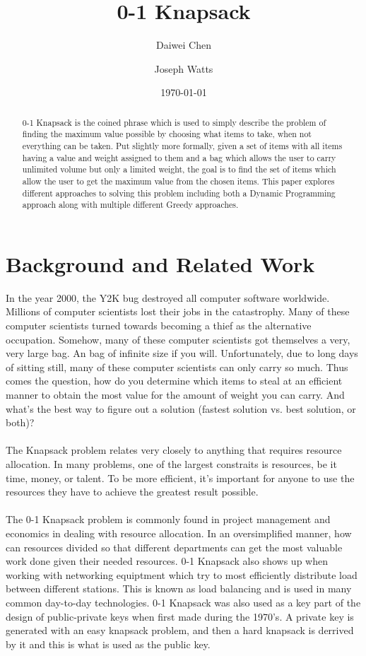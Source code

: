 \documentclass[10pt, letterpaper]{article}
\title{0-1 Knapsack}
\author{Daiwei Chen \and Joseph Watts}
\date{\today}
\begin{document}
\maketitle
\begin{abstract}
	0-1 Knapsack is the coined phrase which is used to simply describe the problem of finding the maximum value possible by choosing what items to take, when not everything can be taken.
 Put slightly more formally, given a set of items with all items having a value and weight assigned to them and a bag which allows the user to carry unlimited volume but only a limited weight, the goal is to find the set of items which allow the user to get the maximum value from the chosen items.
This paper explores different approaches to solving this problem including both a Dynamic Programming approach along with multiple different Greedy approaches.

\end{abstract}

\section{Background and Related Work}
In the year 2000, the Y2K bug destroyed all computer software worldwide. Millions of computer scientists lost their jobs in the catastrophy. Many of these computer scientists turned towards becoming a thief as the alternative occupation. Somehow, many of these computer scientists got themselves a very, very large bag. An bag of infinite size if you will. Unfortunately, due to long days of sitting still, many of these computer scientists can only carry so much. Thus comes the question, how do you determine which items to steal at an efficient manner to obtain the most value for the amount of weight you can carry. And what's the best way to figure out a solution (fastest solution vs. best solution, or both)?\\
\\
The Knapsack problem relates very closely to anything that requires resource allocation. In many problems, one of the largest constraits is resources, be it time, money, or talent. To be more efficient, it's important for anyone to use the resources they have to achieve the greatest result possible.\\
\\
The 0-1 Knapsack problem is commonly found in project management and economics in dealing with resource allocation. In an oversimplified manner, how can resources divided so that different departments can get the most valuable work done given their needed resources.
0-1 Knapsack also shows up when working with networking equiptment which try to most efficiently distribute load between different stations.
This is known as load balancing and is used in many common day-to-day technologies.
0-1 Knapsack was also used as a key part of the design of public-private keys when first made during the 1970's. A private key is generated with an easy knapsack problem, and then a hard knapsack is derrived by it and this is what is used as the public key.
\end{document}
